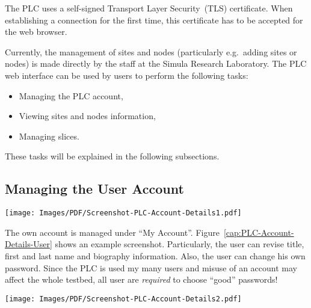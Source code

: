 The PLC uses a self-signed Transport Layer Security~(TLS) certificate. When establishing a connection for the first time, this certificate has to be accepted for the web browser.


Currently, the management of sites and nodes (particularly e.g.\ adding sites or nodes) is made directly by the  staff at the Simula Research Laboratory.
The PLC web interface can be used by  users to perform the following tasks:
\begin{itemize}
 \item Managing the PLC account,
 \item Viewing sites and nodes information,
 \item Managing slices.
\end{itemize}
These tasks will be explained in the following subsections.


\subsection{Managing the User Account}
\label{sub:Managing-the-Account}

\begin{figure*}
\begin{center}
\texttt{[image: Images/PDF/Screenshot-PLC-Account-Details1.pdf]}
\end{center}
\caption{The PLC: My Account $\rightarrow$ Details}
\label{cap:PLC-Account-Details-User}
\end{figure*}

The own account is managed under ``My Account''. Figure~\ref{cap:PLC-Account-Details-User} shows an example screenshot. Particularly, the user can revise title, first and last name and biography information. Also, the user can change his own password. Since the PLC is used my many users and misuse of an account may affect the whole testbed, all user are \emph{required} to choose ``good'' passwords!

\begin{figure*}
\begin{center}
\texttt{[image: Images/PDF/Screenshot-PLC-Account-Details2.pdf]}
\end{center}
\caption{My Account $\rightarrow$ Slices, Key and Roles}
\label{cap:PLC-Account-Details-Key-and-Roles}
\end{figure*}

